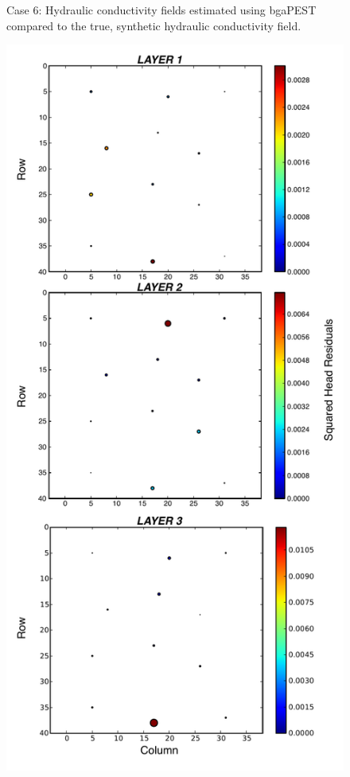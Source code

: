 \documentclass[11pt,oneside,onecolumn]{usgsreport}
\begin{document}
\begin{appendix}
\begin{figure}[H]
\caption{\label{fig:3LK_case6}Case 6: Hydraulic conductivity fields estimated
using bgaPEST compared to the true, synthetic hydraulic conductivity
field.}
\end{figure}


\begin{figure}[H]
\begin{center}\includegraphics[scale=0.5]{figures/3L_resid_case6}\end{center}


\end{figure}
\end{appendix}
\end{document}
